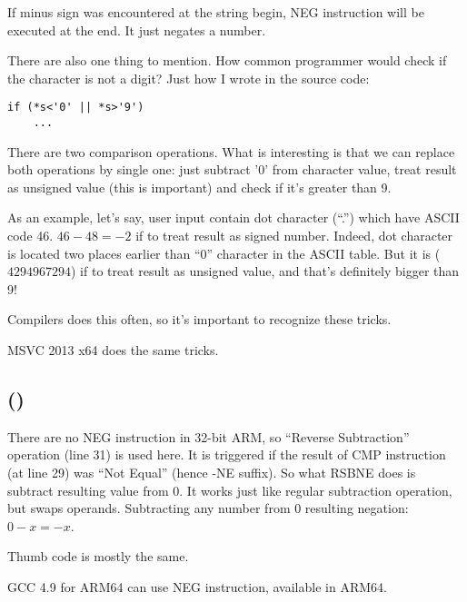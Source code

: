 

If minus sign was encountered at the string begin, 
NEG instruction will be executed at the end.
It just negates a number.

There are also one thing to mention. 
How common programmer would check if the character is not a digit?
Just how I wrote in the source code:

\begin{lstlisting}
if (*s<'0' || *s>'9')
    ...
\end{lstlisting}

There are two comparison operations.
What is interesting is that we can replace both operations by single one: 
just subtract '0' from character value,
treat result as unsigned value (this is important) and check if it's greater than 9.

As an example, let's say, user input contain dot character (``.'') which have \ac{ASCII} code 46.
$46-48=-2$ if to treat result as signed number.
Indeed, dot character is located two places earlier than ``0'' character in the \ac{ASCII} table.
But it is  ($4294967294$) if to treat result as unsigned value, and that's definitely bigger than 9!

Compilers does this often, so it's important to recognize these tricks.

\Optimizing MSVC 2013 x64 does the same tricks.

\ifdefined\IncludeARM
\subsection{\OptimizingKeilVI (\ARMMode)}



There are no NEG instruction in 32-bit ARM, so ``Reverse Subtraction'' operation (line 31) 
is used here.
It is triggered if the result of CMP instruction (at line 29) was ``Not Equal'' (hence -NE suffix).
So what RSBNE does is subtract resulting value from 0.
It works just like regular subtraction operation, but swaps operands.
Subtracting any number from 0 resulting negation: $0-x=-x$.

Thumb code is mostly the same.

GCC 4.9 for ARM64 can use NEG instruction, available in ARM64.
\fi
\fi
